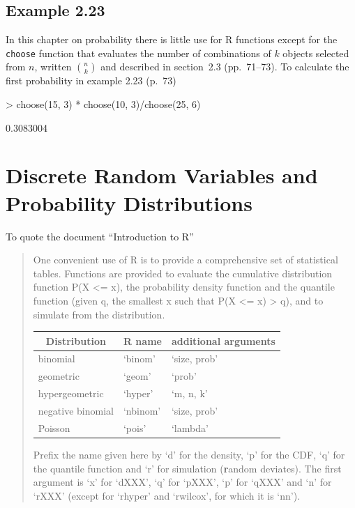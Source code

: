 \documentclass{book}
\begin{document}
\section{Example 2.23}
\label{sec:xmp0223}

In this chapter on probability there is little use for R functions
except for the \texttt{choose} function that evaluates the number of
combinations of $k$ objects selected from $n$, written $\binom{n}{k}$
and described in section~2.3 (pp.~71--73).  To calculate the first
probability in example 2.23 (p.~73)
\begin{Schunk}
\begin{Sinput}
> choose(15, 3) * choose(10, 3)/choose(25, 6)
\end{Sinput}
\begin{Soutput}
[1] 0.3083004
\end{Soutput}
\end{Schunk}


\chapter[Discrete Random Variables]{Discrete Random Variables and
  Probability Distributions}
\label{cha:Discrete}

To quote the document ``Introduction to R''
\begin{quote}
     One convenient use of R is to provide a comprehensive set of
statistical tables.  Functions are provided to evaluate the cumulative
distribution function P(X <= x), the probability density function and
the quantile function (given q, the smallest x such that P(X <= x) > q),
and to simulate from the distribution.
\begin{center}
  \begin{tabular}{l l l}
    \multicolumn{1}{c}{Distribution}&
    \multicolumn{1}{c}{R name}&
    \multicolumn{1}{c}{additional arguments}\\\hline
    binomial& `binom'& `size, prob'\\
    geometric& `geom' & `prob'\\
    hypergeometric&`hyper'&`m, n, k'\\
    negative binomial&`nbinom'&`size, prob'\\
    Poisson&`pois'&`lambda'\\
    \hline
  \end{tabular}
\end{center}

Prefix the name given here by `d' for the density, `p' for the CDF, `q'
for the quantile function and `r' for simulation (\textbf{r}andom deviates).
The first argument is `x' for `dXXX', `q' for `pXXX', `p' for `qXXX'
and `n' for `rXXX' (except for `rhyper' and `rwilcox', for which it is
`nn').
\end{quote}
\end{document}
